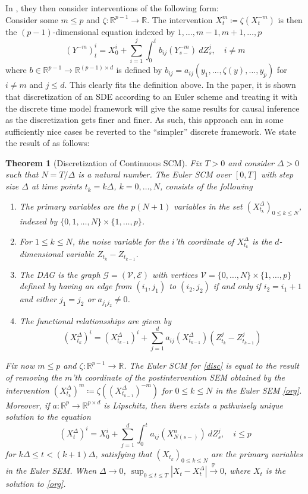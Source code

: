 \documentclass[11pt, a4paper]{memoir}
\theoremstyle{break}
\newtheorem{thm}{Theorem}
\theoremstyle{break}
\theoremstyle{nonumberplain}
\newcommand{\mR}{\mathbb{R}}
\newcommand{\mP}{\mathbb{P}}
\begin{document}
In \cite{sokol2014}, they then consider interventions of the following form:\\[5pt]
Consider some $m\leqslant p$ and $\zeta:\mR^{p-1}\to\mR$. The intervention $X_t^m\coloneqq \zeta(X_t^{-m})$ is then the $(p-1)$-dimensional equation indexed by $1,\ldots,m-1,m+1,\ldots,p$
\begin{equation}\label{disc}
(Y^{-m})_t^i=X_0^i+\sum_{i=1}^j \int_0^t b_{ij}(Y_{s-}^{-m})\ dZ_s^j,\quad i\neq m
\end{equation}
where $b\in \mR^{p-1}\to \mR^{(p-1)\times d}$ is defined by $b_{ij}=a_{ij}(y_1,\ldots,\zeta(y),\ldots,y_p)$ for $i\neq m$ and $j\leqslant d$. This clearly fits the definition above. In the paper, it is shown that discretization of an SDE according to an Euler scheme and treating it with the discrete time model framework will give the same results for causal inference as the discretization gets finer and finer. As such, this approach can in some sufficiently nice cases be reverted to the \enquote{simpler} discrete framework. We state the result of \cite{sokol2014} as follows:
\begin{thm}[Discretization of Continuous SCM]\label{Discret}
Fix $T>0$ and consider $\Delta >0$ such that $N=T/\Delta$ is a natural number. The Euler SCM over $[0,T]$ with step size $\Delta$ at time points $t_k=k\Delta$, $k=0,\ldots, N$, consists of the following
\begin{enumerate}[label=\roman*)]
	\item The primary variables are the $p(N+1)$ variables in the set $(X^{\Delta}_{t_k})_{0\leqslant k\leqslant N}$, indexed by $\{0,1,\ldots, N\}\times \{1,\ldots ,p\}$.
	\item For $1\leqslant k\leqslant N$, the noise variable for the $i$'th coordinate of $X_{t_k}^{\Delta}$ is the $d$-dimensional variable $Z_{t_k}-Z_{t_{k-1}}$.
	\item The DAG is the graph $\mathcal{G}=(\mathcal{V},\mathcal{E})$ with vertices $\mathcal{V}=\{0,\ldots, N\}\times \{1,\ldots, p\}$ defined by having an edge from $(i_1,j_1)$ to $(i_2,j_2)$ if and only if $i_2=i_1+1$ and either $j_1=j_2$ or $a_{j_1j_2}\neq 0$.
	\item The functional relationsships are given by
	$$(X_{t_k}^\Delta)^i=(X_{t_{k-1}}^\Delta)^i+\sum_{j=1}^da_{ij}(X_{t_{k-1}}^{\Delta})(Z_{t_k}^j-Z_{t_{k-1}}^j)$$
\end{enumerate}
Fix now $m\leqslant p$ and $\zeta:\mR^{p-1}\to\mR$. The Euler SCM for \ref{disc} is equal to the result of removing the $m$'th coordinate of the postintervention SEM obtained by the intervention $(X_{t_k}^\Delta)^m\coloneqq \zeta((X_{t_{k-1}}^\Delta)^{-m})$ for $0\leqslant k\leqslant N$ in the Euler SEM \ref{org}.\\[5pt]
Moreover, if $a:\mR^p\to\mR^{p\times d}$ is Lipschitz, then there exists a pathwisely unique solution to the equation 
$$(X^\Delta_t)^i=X_0^i+\sum_{j=1}^d\int_0^t a_{ij}(X^n_{N(s-)})\ dZ_s^j,\quad i\leqslant p$$
for $k\Delta\leqslant t<(k+1)\Delta$, satisfying that $(X_{t_{k}})_{0\leqslant k\leqslant N}$ are the primary variables in the Euler SEM. When $\Delta\to 0$, $\sup_{0\leqslant t\leqslant T}|X_t-X_t^{\Delta}|\overset{\mP}{\to}0$, where $X_t$ is the solution to \ref{org}.
\end{thm}
\end{document}
